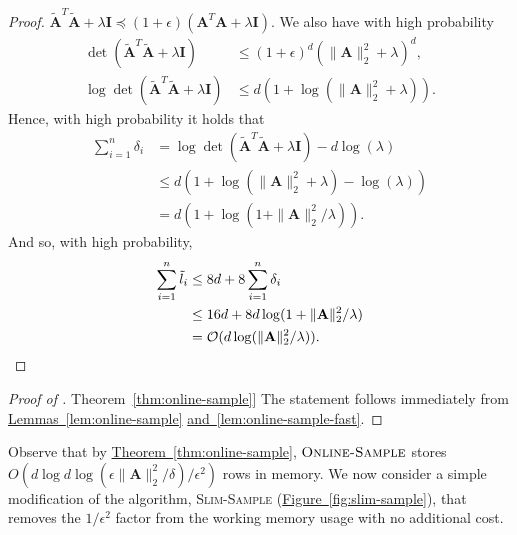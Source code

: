 \documentclass[11pt]{article}
\numberwithin{equation}{section}
\theoremstyle{definition}
\theoremstyle{plain}
\newcommand{\expref}[2]{\hyperref[#2]{#1~\ref{#2}}}
\newcommand{\Oh}{\ensuremath{\mathcal{O}}}
\newcommand{\bv}[1]{\mathbf{#1}}
\newcommand{\norm}[1]{\|#1\|}
\begin{document}
\begin{proof}
    $
        \bv{\tilde{A}}^T\tilde{\bv{A}} + \lambda \bv{I} \preceq (1+\epsilon)(\bv{A}^T\bv{A} + \lambda \bv{I}).
    $
    We also have with high probability
    \begin{align*}
        \det (\bv{\tilde{A}}^T\tilde{\bv{A}} + \lambda \bv{I}) &\leq (1+\epsilon)^d(\norm{\bv{A}}_2^2 + \lambda)^d,\\
        \log \det (\bv{\tilde{A}}^T\tilde{\bv{A}} + \lambda \bv{I}) &\leq d(1 + \log(\norm{\bv{A}}_2^2 + \lambda)).
    \end{align*}
    Hence, with high probability it holds that
    \begin{align*}
        \sum_{i=1}^n \delta_i &= \log \det (\bv{\tilde{A}}^T\tilde{\bv{A}} + \lambda \bv{I}) - d \log(\lambda)\\
                              &\leq d(1 + \log(\norm{\bv A}_2^2 + \lambda) - \log(\lambda))\\
                              &= d(1 + \log(1 + \norm{\bv A}_2^2 / \lambda)).
    \end{align*}
    And so, with high probability,
    \begin{align*}
        \sum_{i=1}^n \tilde{l}_i &\leq 8d + 8\sum_{i=1}^n \delta_i\\
                                 &\leq 16d + 8d\log(1 + \norm{\bv A}_2^2 / \lambda)\\
                                 &= \Oh(d \log(\norm{\bv A}_2^2 / \lambda)). \qedhere
    \end{align*}
\end{proof}
%

\begin{proof}[Proof of \expref{Theorem}{thm:online-sample}]
The statement follows immediately from
\expref{Lemmas}{lem:online-sample} \expref{and}{lem:online-sample-fast}.
\end{proof}

Observe that by \expref{Theorem}{thm:online-sample}, $\textsc{Online-Sample}$ stores $O(d \log d \log(\epsilon \norm{\bv{A}}_2^2/\delta)/\epsilon^2)$ rows in memory. 
We now consider a simple modification of the algorithm, \textsc{Slim-Sample}  (\expref{Figure}{fig:slim-sample}), that removes the $1/\epsilon^2$ factor from the working memory usage with no additional cost.
\end{document}
